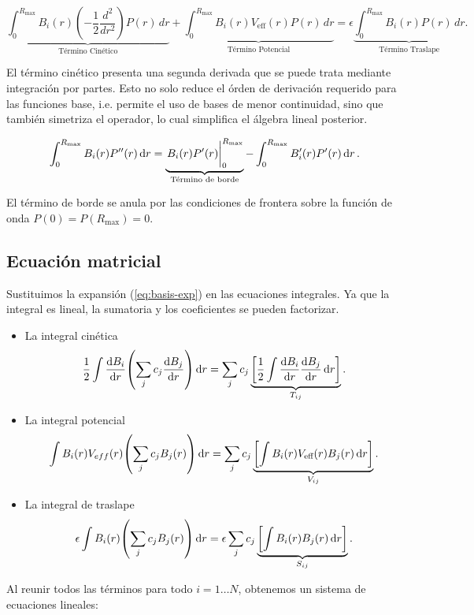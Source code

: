 \documentclass[12pt, a4paper, oneside, spanish]{book}
\begin{document}
\[ \underbrace{\int_{0}^{R_{\text{max}}} B_i(r) \left( -\frac{1}{2} \frac{d^2}{dr^2} \right) P(r) \, dr}_{\text{Término Cinético}} + \underbrace{\int_{0}^{R_{\text{max}}} B_i(r) V_{\text{eff}}(r) P(r) \, dr}_{\text{Término Potencial}} = \epsilon \underbrace{\int_{0}^{R_{\text{max}}} B_i(r) P(r) \, dr}_{\text{Término Traslape}}. \]

El término cinético presenta una segunda derivada que se puede trata mediante integración por partes. Esto no solo reduce el órden de derivación requerido para las funciones base, i.e. permite el uso de bases de menor continuidad, sino que también simetriza el operador, lo cual simplifica el álgebra lineal posterior.

\begin{equation} \label{eq:k-ibp}
  \int_{0}^{R_{\text{max}}} B_i(r) P''(r) \dd{r} = \underbrace{\eval{ B_i(r) P'(r) }_{0}^{R_{\text{max}}}}_{\text{Término de borde}} - \int_{0}^{R_{\text{max}}} B_i'(r) P'(r) \dd{r}.
\end{equation}

El término de borde se anula por las condiciones de frontera sobre la función de onda \( P(0) = P(R_{\text{max}})=0 \).

\subsection{Ecuación matricial}

Sustituimos la expansión (\cref{eq:basis-exp}) en las ecuaciones integrales. Ya que la integral es lineal, la sumatoria y los coeficientes se pueden factorizar.

\begin{itemize}
\item La integral cinética
  \[ \frac{1}{2} \int \dv{B_i}{r} \qty(\sum_jc_j\dv{B_{j}}{r})\dd{r} = \sum_jc_j\underbrace{\qty[\frac{1}{2}\int \dv{B_i}{r}\dv{B_j}{r}\dd{r}]}_{T_{ij}}. \]
\item La integral potencial
  \[ \int B_i(r)V_{eff}(r) \qty(\sum_jc_jB_j(r)) \dd{r} = \sum_jc_j \underbrace{\qty[\int B_i(r)V_{\text{eff}}(r)B_j(r)\dd{r}]}_{V_{ij}}. \]
\item La integral de traslape
  \[ \epsilon \int B_i(r) \qty(\sum_jc_jB_j(r)) \dd{r} = \epsilon \sum_jc_j \underbrace{\qty[\int B_i(r)B_j(r)\dd{r}]}_{S_{ij}}. \]
\end{itemize}

Al reunir todos las términos para todo \( i = 1 \dots N \), obtenemos un sistema de ecuaciones lineales:
\end{document}
